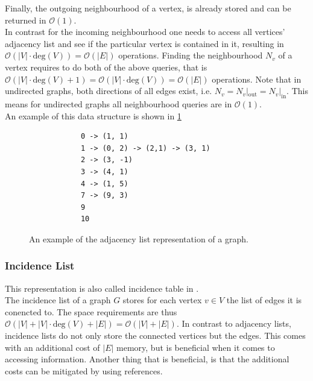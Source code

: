         Finally, the outgoing neighbourhood of a vertex, is already stored and can be returned in $\mathcal{O}(1)$.\\
        In contrast for the incoming neighbourhood one needs to access all vertices' adjacency list and see if the particular vertex is contained in it, resulting in $\mathcal{O}(|V| \cdot \text{deg}(V)) = \mathcal{O}(|E|)$ operations.
        Finding the neighbourhood $N_v$ of a vertex requires to do both of the above queries, that is $\mathcal{O}(|V| \cdot \text{deg}(V) + 1) = \mathcal{O}(|V| \cdot \text{deg}(V))  = \mathcal{O}(|E|)$ operations.  
        Note that in undirected graphs, both directions of all edges exist, i.e. $N_v = N_v |_\text{out} = N_v |_\text{in}$. This means for undirected graphs all neighbourhood queries are in $\mathcal{O}(1)$. \\
        
        An example of this data structure is shown in \ref{adjl}
        
        \begin{figure}[htp]
         \begin{center}
          \begin{verbatim}
            0 -> (1, 1)
            1 -> (0, 2) -> (2,1) -> (3, 1)
            2 -> (3, -1)
            3 -> (4, 1)
            4 -> (1, 5)
            7 -> (9, 3)
            9
            10
          \end{verbatim}
         \end{center}
         \caption{An example of the adjacency list representation of a graph.}
         \label{adjl}
        \end{figure}
        
        \subsubsection*{Incidence List}
        This representation is also called incidence table in \autocite{Gross1998GraphTA}. \\
        The incidence list of a graph $G$ stores for each vertex $v \in V$ the list of edges it is conencted to. 
        The space requirements are thus $\mathcal{O}(|V| + |V| \cdot \text{deg}(V) + |E|) = \mathcal{O}(|V| + |E|)$. 
        In contrast to adjacency lists, incidence lists do not only store the connected vertices but the edges. 
        This comes with an additional cost of $|E|$ memory, but is beneficial when it comes to accessing information. 
        Another thing that is beneficial, is that the additional costs can be mitigated by using references. \\
        
